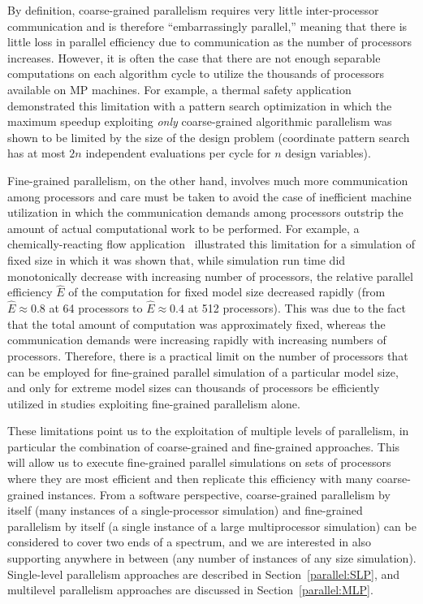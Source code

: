By definition, coarse-grained parallelism requires very little
inter-processor communication and is therefore ``embarrassingly
parallel,'' meaning that there is little loss in parallel efficiency
due to communication as the number of processors increases. However,
it is often the case that there are not enough separable computations
on each algorithm cycle to utilize the thousands of processors
available on MP machines. For example, a thermal safety
application~\cite{Eld96a} demonstrated this limitation with a pattern
search optimization in which the maximum speedup exploiting
\emph{only} coarse-grained algorithmic parallelism was shown to be
limited by the size of the design problem (coordinate pattern search
has at most $2n$ independent evaluations per cycle for $n$ design
variables).

Fine-grained parallelism, on the other hand, involves much more
communication among processors and care must be taken to avoid the
case of inefficient machine utilization in which the communication
demands among processors outstrip the amount of actual computational
work to be performed. For example, a chemically-reacting flow
application~\cite{Eld98a} illustrated this limitation for a simulation
of fixed size in which it was shown that, while simulation run time
did monotonically decrease with increasing number of processors, the
relative parallel efficiency $\hat{E}$ of the computation for fixed
model size decreased rapidly (from $\hat{E} \approx 0.8$ at 64
processors to $\hat{E} \approx 0.4$ at 512 processors). This was due
to the fact that the total amount of computation was approximately
fixed, whereas the communication demands were increasing rapidly with
increasing numbers of processors. Therefore, there is a practical
limit on the number of processors that can be employed for
fine-grained parallel simulation of a particular model size, and only
for extreme model sizes can thousands of processors be efficiently
utilized in studies exploiting fine-grained parallelism alone.

These limitations point us to the exploitation of multiple levels of
parallelism, in particular the combination of coarse-grained and
fine-grained approaches. This will allow us to execute fine-grained
parallel simulations on sets of processors where they are most
efficient and then replicate this efficiency with many coarse-grained
instances.  From a software perspective, coarse-grained parallelism by
itself (many instances of a single-processor simulation) and
fine-grained parallelism by itself (a single instance of a large
multiprocessor simulation) can be considered to cover two ends of a
spectrum, and we are interested in also supporting anywhere in between
(any number of instances of any size simulation).  Single-level
parallelism approaches are described in Section~\ref{parallel:SLP},
and multilevel parallelism approaches are discussed in
Section~\ref{parallel:MLP}.

